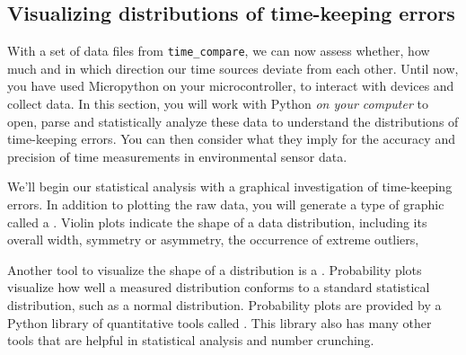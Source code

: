 \subsection{Visualizing distributions of time-keeping errors}

With a set of data files from \lstinline{time_compare}, we can now assess whether, how much and in which direction our time sources deviate from each other. 
Until now, you have used Micropython on your microcontroller, to interact with devices and collect data.
In this section, you will work with Python \emph{on your computer} to open, parse and statistically analyze these data to understand the distributions of time-keeping errors.
You can then consider what they imply for the accuracy and precision of time measurements in environmental sensor data.  

We'll begin our statistical analysis with a graphical investigation of time-keeping errors. 
In addition to plotting the raw data, you will generate a type of graphic called a .
Violin plots indicate the shape of a data distribution, including its overall width, symmetry or asymmetry, the occurrence of extreme outliers, \etc

Another tool to visualize the shape of a distribution is a .
Probability plots visualize how well a measured distribution conforms to a standard statistical distribution, such as a normal distribution. 
Probability plots are provided by a Python library of quantitative tools called \scipy.
This library also has many other tools that are helpful in statistical analysis and number crunching. 

